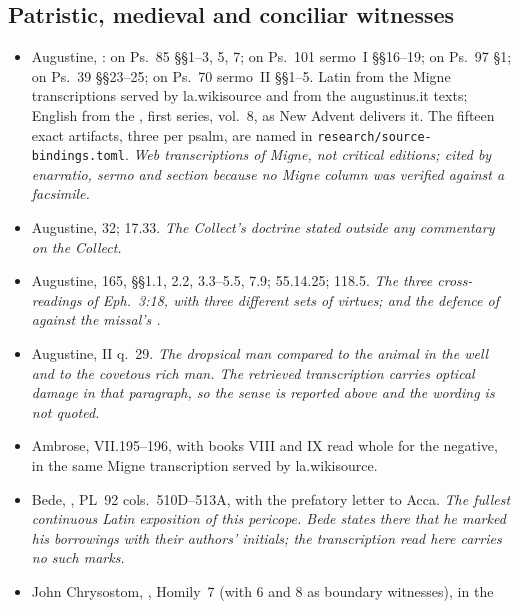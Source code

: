 \subsection*{Patristic, medieval and conciliar witnesses}

\begin{itemize}[leftmargin=1.2em, itemsep=0.15em]
\item Augustine, : on Ps.~85 \S\S1--3, 5, 7; on
Ps.~101 sermo~I \S\S16--19; on Ps.~97 \S1; on Ps.~39 \S\S23--25; on Ps.~70
sermo~II \S\S1--5. Latin from the Migne transcriptions served by la.wikisource
and from the augustinus.it texts; English from the , first series, vol.~8, as New Advent delivers it. The fifteen exact
artifacts, three per psalm, are named in
\texttt{research/source-bindings.toml}. \textit{Web transcriptions of Migne, not critical editions;
cited by enarratio, sermo and section because no Migne column was verified
against a facsimile.}
\item Augustine,  32;  17.33. \textit{The Collect's doctrine stated outside any commentary on
the Collect.}
\item Augustine,  165, \S\S1.1, 2.2, 3.3--5.5, 7.9; 
55.14.25;  118.5. \textit{The three
cross-readings of Eph.~3:18, with three different sets of virtues; and the
defence of  against the missal's .}
\item Augustine,  II q.~29. \textit{The dropsical
man compared to the animal in the well and to the covetous rich man. The
retrieved transcription carries optical damage in that paragraph, so the sense
is reported above and the wording is not quoted.}
\item Ambrose,  VII.195--196, with
books VIII and IX read whole for the negative, in the same Migne transcription
served by la.wikisource.
\item Bede, , PL~92 cols.\ 510D--513A, with
the prefatory letter to Acca. \textit{The fullest continuous Latin exposition of
this pericope. Bede states there that he marked his borrowings with their
authors' initials; the transcription read here carries no such marks.}
\item John Chrysostom, , Homily~7
(with 6 and 8 as boundary witnesses), in the 
\end{itemize}
